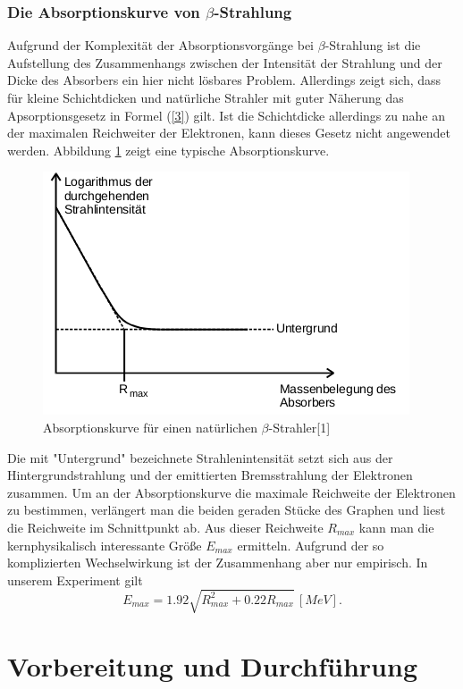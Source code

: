 \documentclass[11pt,ngerman,a4paper]{article}
\begin{document}
\subsubsection{Die Absorptionskurve von $\beta$-Strahlung}
Aufgrund der Komplexität der Absorptionsvorgänge bei $\beta$-Strahlung ist die Aufstellung des Zusammenhangs zwischen der Intensität der Strahlung und der Dicke des Absorbers ein hier nicht lösbares Problem. Allerdings zeigt sich, dass für kleine Schichtdicken und natürliche Strahler mit guter Näherung das Apsorptionsgesetz in Formel (\ref{3}) gilt. Ist die Schichtdicke allerdings zu nahe an der maximalen Reichweiter der Elektronen, kann dieses Gesetz nicht angewendet werden. Abbildung \ref{a3} zeigt eine typische Absorptionskurve.
\begin{figure}[h]
\centering
\includegraphics[scale=0.9]{abb3.png}
\caption{Absorptionskurve für einen natürlichen $\beta$-Strahler[1]}
\label{a3}
\end{figure}
 Die mit "Untergrund" bezeichnete Strahlenintensität setzt sich aus der Hintergrundstrahlung und der emittierten Bremsstrahlung der Elektronen zusammen. Um an der Absorptionskurve die maximale Reichweite der Elektronen zu bestimmen, verlängert man die beiden geraden Stücke des Graphen und liest die Reichweite im Schnittpunkt ab. Aus dieser Reichweite $R_{max}$ kann man die kernphysikalisch interessante Größe $E_{max}$ ermitteln. Aufgrund der so komplizierten Wechselwirkung ist der Zusammenhang aber nur empirisch. In unserem Experiment gilt
\begin{equation}
E_{max} = 1.92\sqrt{R_{max}^2 + 0.22 R_{max}}\, [MeV].
\label{10}
\end{equation}
\section{Vorbereitung und Durchführung}
\end{document}
